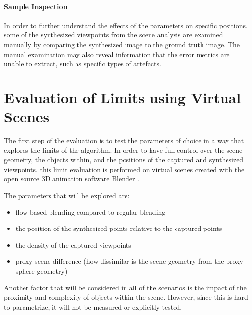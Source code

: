 \paragraph{Sample Inspection}
In order to further understand the effects of the parameters on specific positions, some of the synthesized viewpoints from the scene analysis are examined manually by comparing the synthesized image to the ground truth image. The manual examination may also reveal information that the error metrics are unable to extract, such as specific types of artefacts.

\section{Evaluation of Limits using Virtual Scenes} \label{sec:limit_eval}
The first step of the evaluation is to test the parameters of choice in a way that explores the limits of the algorithm. In order to have full control over the scene geometry, the objects within, and the positions of the captured and synthesized viewpoints, this limit evaluation is performed on virtual scenes created with the open source 3D animation software Blender \cite{blender}.

The parameters that will be explored are:
\begin{itemize}
  \item flow-based blending compared to regular blending
  \item the position of the synthesized points relative to the captured points
  \item the density of the captured viewpoints
  \item proxy-scene difference (how dissimilar is the scene geometry from the proxy sphere geometry)
\end{itemize}

Another factor that will be considered in all of the scenarios is the impact of the proximity and complexity of objects within the scene. However, since this is hard to parametrize, it will not be measured or explicitly tested.


